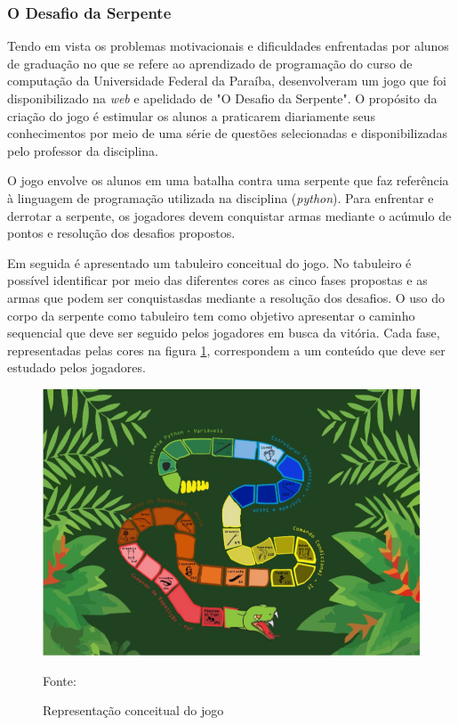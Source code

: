 \subsubsection{O Desafio da Serpente}
Tendo em vista os problemas motivacionais e dificuldades enfrentadas por alunos de graduação no que se refere ao
aprendizado de programação do curso de computação da Universidade Federal
da Paraíba,  desenvolveram um jogo que foi disponibilizado na \textit{web} {\itshape} e apelidado
de "O Desafio da Serpente". O propósito da criação do jogo é estimular os alunos a praticarem diariamente seus conhecimentos
por meio de uma série de questões selecionadas e disponibilizadas pelo professor da disciplina.

O jogo envolve os alunos em uma batalha contra uma serpente que faz referência à linguagem de programação utilizada na
disciplina (\textit{python}{\itshape}). Para enfrentar e derrotar a serpente, os jogadores devem conquistar armas mediante o acúmulo
de pontos e resolução dos desafios propostos. 

Em seguida é apresentado um tabuleiro conceitual do jogo. No tabuleiro é possível
identificar por meio das diferentes cores as cinco fases propostas e as armas que podem ser conquistasdas mediante a
resolução dos desafios. O uso do corpo da serpente como tabuleiro tem como objetivo apresentar o caminho sequencial que deve
ser seguido pelos jogadores em busca da vitória. Cada fase, representadas pelas cores na figura \ref{figura1}, correspondem a um conteúdo
que deve ser estudado pelos jogadores.

\begin{figure}[h]
	\centering
	\includegraphics[keepaspectratio=true,scale=0.25]{figuras/desafioSerpente.png}
	\caption{Representação conceitual do jogo}
	Fonte: \cite{raposo2016desafio}
	\label{figura1}
\end{figure}

